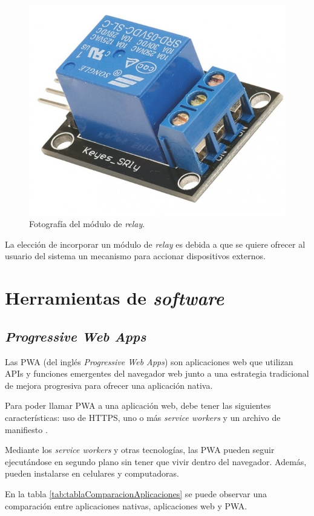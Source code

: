 \begin{figure}[H]
	\centering
	\includegraphics[width=.4\textwidth]{./Figures/Relay.jpg}
	\caption{Fotografía del módulo de \emph{relay}\protect\footnotemark.}
	\label{fig:fotografiaRelay}
\end{figure}


La elección de incorporar un módulo de \emph{relay} es debida a que se quiere ofrecer al usuario del sistema un mecanismo para accionar dispositivos externos.

\section{Herramientas de \emph{software}}

\subsection{\textit{Progressive Web Apps}}

Las PWA (del inglés \textit{Progressive Web Apps}) \citep{WEBSITE:PWA} son aplicaciones web que utilizan APIs y funciones emergentes del navegador web junto a una estrategia tradicional de mejora progresiva para ofrecer una aplicación nativa. 

Para poder llamar PWA a una aplicación web, debe tener las siguientes características: uso de HTTPS, uno o más \emph{service workers} \citep{WEBSITE:SERVICEWORKERS} y un archivo de manifiesto \citep{WEBSITE:MANIFEST}.

Mediante los \emph{service workers} y otras tecnologías, las PWA pueden seguir ejecutándose en segundo plano sin tener que vivir dentro del navegador. Además, pueden instalarse en celulares y computadoras.

En la tabla \ref{tab:tablaComparacionAplicaciones} se puede observar una comparación entre aplicaciones nativas, aplicaciones web y PWA.


